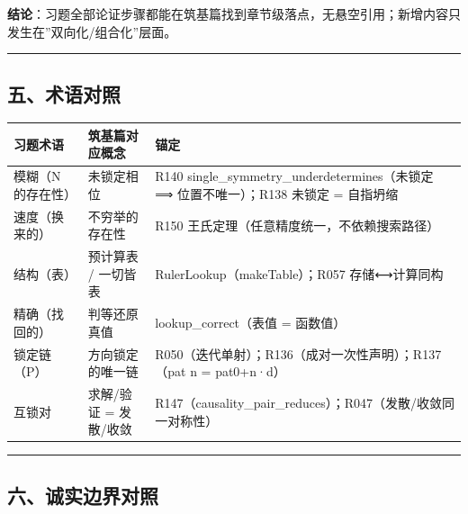 \documentclass[
]{article}
\newcounter{none} %
\begin{document}
\textbf{结论}：习题全部论证步骤都能在筑基篇找到章节级落点，无悬空引用；新增内容只发生在''双向化/组合化''层面。

\begin{center}\rule{0.5\linewidth}{0.5pt}\end{center}

\subsection{五、术语对照}\label{ux4e94ux672fux8bedux5bf9ux7167}

{\def\LTcaptype{none} %
\begin{longtable}[]{@{}
  >{\raggedright\arraybackslash}p{}
  >{\raggedright\arraybackslash}p{}
  >{\raggedright\arraybackslash}p{}@{}}
\toprule\noalign{}
\begin{minipage}[b]{\linewidth}\raggedright
习题术语
\end{minipage} & \begin{minipage}[b]{\linewidth}\raggedright
筑基篇对应概念
\end{minipage} & \begin{minipage}[b]{\linewidth}\raggedright
锚定
\end{minipage} \\
\midrule\noalign{}
\endhead
\bottomrule\noalign{}
\endlastfoot
模糊（N 的存在性） & 未锁定相位 & R140
single\_symmetry\_underdetermines（未锁定 ⟹ 位置不唯一）；R138 未锁定 =
自指坍缩 \\
速度（换来的） & 不穷举的存在性 & R150
王氏定理（任意精度统一，不依赖搜索路径） \\
结构（表） & 预计算表 / 一切皆表 & RulerLookup（makeTable）；R057
存储⟷计算同构 \\
精确（找回的） & 判等还原真值 & lookup\_correct（表值 = 函数值） \\
锁定链（P） & 方向锁定的唯一链 &
R050（迭代单射）；R136（成对一次性声明）；R137（pat n = pat0+n·d） \\
互锁对 & 求解/验证 = 发散/收敛 &
R147（causality\_pair\_reduces）；R047（发散/收敛同一对称性） \\
\end{longtable}
}

\begin{center}\rule{0.5\linewidth}{0.5pt}\end{center}

\subsection{六、诚实边界对照}\label{ux516dux8bdaux5b9eux8fb9ux754cux5bf9ux7167}
\end{document}
